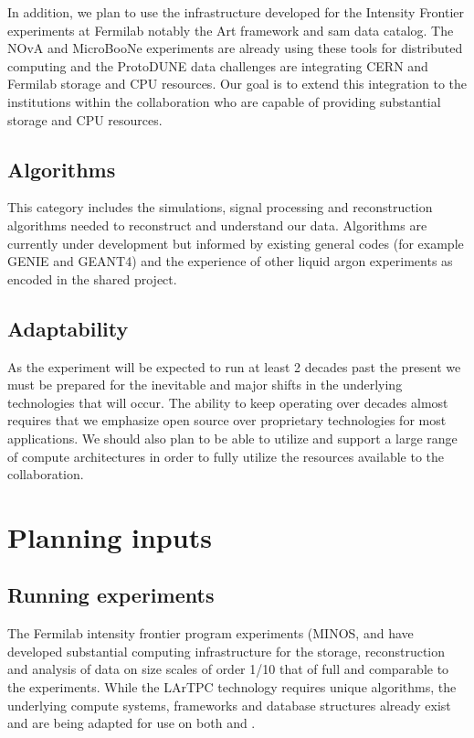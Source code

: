In addition, we plan to use the infrastructure developed for the Intensity Frontier experiments at Fermilab notably the Art framework and sam data catalog.  The NOvA and MicroBooNe experiments are already using these tools for distributed computing and the ProtoDUNE data challenges are integrating CERN and Fermilab storage and CPU resources.  Our goal is to extend this integration to the  institutions within the collaboration who are capable of providing substantial storage and CPU resources. 



\subsection{Algorithms}
This category includes the simulations, signal processing and reconstruction algorithms needed to reconstruct and understand our data. Algorithms are currently under development but informed by existing general codes (for example GENIE and GEANT4) and the experience of other liquid argon experiments as encoded in the shared   project.  





\subsection{Adaptability}
As the experiment will be expected to run at least 2 decades past the present we must be prepared for the inevitable and major shifts in the underlying technologies that will occur. The ability to keep operating over decades almost requires that we emphasize open source over proprietary technologies for most applications.  We should also plan to be able to utilize and support a large range of compute architectures in order to fully utilize the resources available to the collaboration.






\section{Planning inputs}


\subsection{Running experiments}\label{sw:IF-input}

The Fermilab intensity frontier program experiments (MINOS\cite{minos},  \cite{minerva} and  \cite{nova} have developed substantial computing infrastructure for the storage, reconstruction and analysis of data on size scales of order 1/10 that of full   and comparable to the  experiments. While the LArTPC technology requires unique algorithms, the underlying compute systems, frameworks and database structures already exist and are being adapted for use on both  and  .


